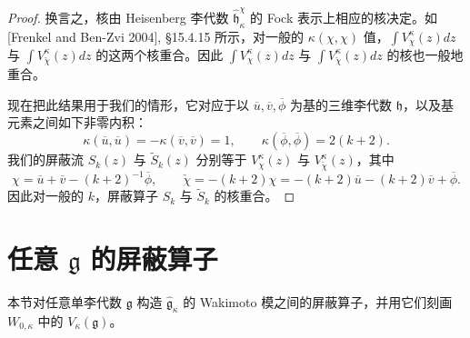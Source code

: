 \begin{proof}
换言之，核由 Heisenberg 李代数 $\widehat{\mathfrak{h}}_\kappa^\chi$ 的 Fock 表示上相应的核决定。如 [Frenkel and Ben-Zvi 2004], §15.4.15 所示，对一般的 $\kappa(\chi,\chi)$ 值，$\int V_\chi^\kappa(z)dz$ 与 $\int V_{\check{\chi}}^\kappa(z)dz$ 的这两个核重合。因此 $\int V_\chi^\kappa(z)dz$ 与 $\int V_{\check{\chi}}^\kappa(z)dz$ 的核也一般地重合。

现在把此结果用于我们的情形，它对应于以 $\overline{u},\overline{v},\overline{\phi}$ 为基的三维李代数 $\mathfrak{h}$，以及基元素之间如下非零内积：
\[
    \kappa(\overline{u},\overline{u})=-\kappa(\overline{v},\overline{v})=1,\qquad
    \kappa(\overline{\phi},\overline{\phi})=2(k+2).
\]
我们的屏蔽流 $S_k(z)$ 与 $\widetilde{S}_k(z)$ 分别等于 $V_\chi^\kappa(z)$ 与 $V_{\check{\chi}}^\kappa(z)$，其中
\[
    \chi=\overline{u}+\overline{v}-(k+2)^{-1}\overline{\phi},\qquad
    \check{\chi}=-(k+2)\chi=-(k+2)\overline{u}-(k+2)\overline{v}+\overline{\phi}.
\]
因此对一般的 $k$，屏蔽算子 $S_k$ 与 $\widetilde{S}_k$ 的核重合。
\end{proof}


\section{任意 $\mathfrak{g}$ 的屏蔽算子}

本节对任意单李代数 $\mathfrak{g}$ 构造 $\hat{\mathfrak{g}}_\kappa$ 的 Wakimoto 模之间的屏蔽算子，并用它们刻画 $W_{0,\kappa}$ 中的 $V_\kappa(\mathfrak{g})$。

